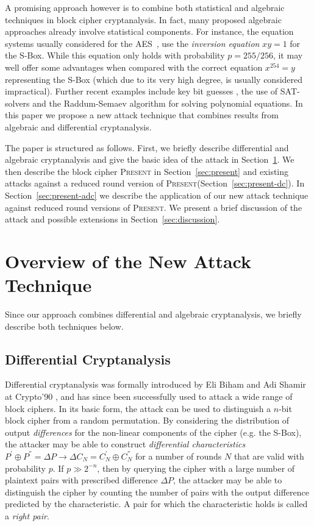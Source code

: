 \documentclass{llncs}
\newcommand{\PRESENT}{\textsc{Present}\xspace}
\begin{document}
A promising approach however is to combine both statistical and algebraic
techniques in block cipher cryptanalysis. In fact, many proposed algebraic
approaches already involve statistical components. For instance, the equation
systems usually considered for the
AES~\cite{murphy-robshaw:crypto2002,alg-aes-book}, use
the \emph{inversion equation} $xy = 1$ for the S-Box. While this equation
only holds with probability $p = 255/256$, it may well offer some advantages
when
compared with the correct equation $x^{254} = y$ representing the S-Box (which
due to its very high degree, is usually considered impractical). Further recent
examples include key bit guesses \cite{alg-des}, the use of SAT-solvers
\cite{bard-phd} and the Raddum-Semaev algorithm \cite{Raddum2006} for solving
polynomial equations. In this paper we propose a new attack technique that
combines results from algebraic and differential cryptanalysis.

The paper is structured as follows. First, we briefly describe differential and
algebraic cryptanalysis and give the basic idea of the attack in
Section~\ref{sec:overview}. We then describe the block cipher \PRESENT in
Section~\ref{sec:present} and existing attacks against a reduced round
version of \PRESENT (Section~\ref{sec:present-dc}). In
Section~\ref{sec:present-adc} we describe the application of our new attack
technique against reduced round versions of \PRESENT. We present a brief
discussion of the attack and possible extensions in
Section~\ref{sec:discussion}.

\section{Overview of the New Attack Technique}
\label{sec:overview}
Since our approach combines differential and algebraic cryptanalysis, we
briefly describe both techniques below. 
\subsection{Differential Cryptanalysis}
Differential cryptanalysis was formally
introduced by Eli Biham and Adi Shamir at
Crypto'90 \cite{Biham1991}, and has since been successfully used to attack a
wide range of block ciphers. In its basic form, the attack can be used to
distinguish a $n$-bit block cipher from a random permutation. By
considering the distribution of output \emph{differences} for the non-linear
components of the cipher (e.g. the S-Box), the attacker may be able to construct
\emph{differential characteristics} \mbox{$P^{'} \oplus P^{''} = \Delta P
\rightarrow \Delta C_N = C_N^{'} \oplus C_N^{''}$} for a number of rounds
$N$ that are valid with probability $p$. If $p \gg 2^{-n}$, then by
querying the cipher with a large number of plaintext pairs with prescribed
difference $\Delta P$, the attacker may be able to distinguish the cipher by
counting the number of pairs with the output difference predicted by the
characteristic. A pair for which the characteristic holds is called a
\emph{right pair}.
\end{document}
